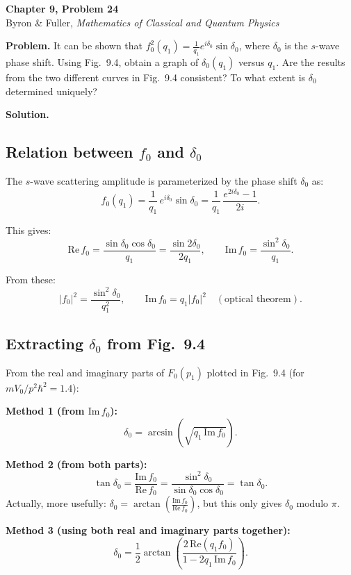 \documentclass[12pt]{article}
\begin{document}
\begin{center}
{\Large\bfseries Chapter 9, Problem 24}\\[6pt]
Byron \& Fuller, \textit{Mathematics of Classical and Quantum Physics}
\end{center}

\bigskip

\textbf{Problem.} It can be shown that $f_0^2(q_1) = \frac{1}{q_1}e^{i\delta_0}\sin\delta_0$, where $\delta_0$ is the $s$-wave phase shift. Using Fig.~9.4, obtain a graph of $\delta_0(q_1)$ versus $q_1$. Are the results from the two different curves in Fig.~9.4 consistent? To what extent is $\delta_0$ determined uniquely?

\bigskip
\textbf{Solution.}

\subsection*{Relation between $f_0$ and $\delta_0$}

The $s$-wave scattering amplitude is parameterized by the phase shift $\delta_0$ as:
\[
f_0(q_1) = \frac{1}{q_1}\,e^{i\delta_0}\sin\delta_0 = \frac{1}{q_1}\,\frac{e^{2i\delta_0} - 1}{2i}.
\]

This gives:
\[
\mathrm{Re}\,f_0 = \frac{\sin\delta_0\cos\delta_0}{q_1} = \frac{\sin 2\delta_0}{2q_1}, \qquad \mathrm{Im}\,f_0 = \frac{\sin^2\delta_0}{q_1}.
\]

From these:
\[
|f_0|^2 = \frac{\sin^2\delta_0}{q_1^2}, \qquad \mathrm{Im}\,f_0 = q_1|f_0|^2 \quad (\text{optical theorem}).
\]

\subsection*{Extracting $\delta_0$ from Fig.~9.4}

From the real and imaginary parts of $F_0(p_1)$ plotted in Fig.~9.4 (for $mV_0/p^2\hbar^2 = 1.4$):

\textbf{Method 1 (from $\mathrm{Im}\,f_0$):}
\[
\delta_0 = \arcsin\!\left(\sqrt{q_1\,\mathrm{Im}\,f_0}\right).
\]

\textbf{Method 2 (from both parts):}
\[
\tan\delta_0 = \frac{\mathrm{Im}\,f_0}{\mathrm{Re}\,f_0} = \frac{\sin^2\delta_0}{\sin\delta_0\cos\delta_0} = \tan\delta_0.
\]
Actually, more usefully: $\delta_0 = \arctan\!\left(\frac{\mathrm{Im}\,f_0}{\mathrm{Re}\,f_0}\right)$, but this only gives $\delta_0$ modulo $\pi$.

\textbf{Method 3 (using both real and imaginary parts together):}
\[
\delta_0 = \frac{1}{2}\arctan\!\left(\frac{2\,\mathrm{Re}(q_1 f_0)}{1 - 2q_1\,\mathrm{Im}\,f_0}\right).
\]
\end{document}
